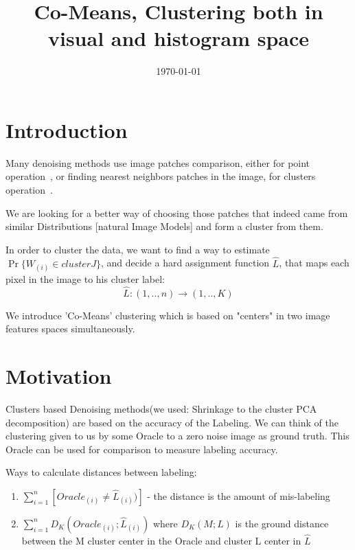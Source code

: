 \documentclass{article}
\title{Co-Means, Clustering both in visual and histogram space}
\author{}
\date{\today}
\begin{document}
\maketitle

\section{Introduction}
Many denoising methods use image patches comparison, either for point operation~\cite{BM3Dipol}, or finding nearest neighbors patches in the image, for clusters operation~\cite{nonlocalmeans}.

We are looking for a better way of choosing those patches that indeed came from similar Distributions [natural Image Models] and form a cluster from them.

In order to cluster the data, we want to find a way to estimate $ \Pr\{W_{(i)}\in cluster J \}$, and decide a hard assignment function $ \widehat{L} $, that maps each pixel in the image to his cluster label:
\begin{equation}
\hat L :(1,..,n)\rightarrow (1,..,K)
\end{equation}

We introduce 'Co-Means' clustering which is based on "centers" in two image features spaces simultaneously.


\section{Motivation}
Clusters based Denoising methods(we used: Shrinkage to the  cluster PCA decomposition) are based on the accuracy of the Labeling.
We can think of the clustering given to us by some Oracle to a zero noise image as ground truth. This Oracle can be used for comparison to measure labeling accuracy. 


Ways to calculate distances between labeling:
\begin{enumerate}
	\item $ \sum_{i=1}^{n} [Oracle_{(i)}\ne\hat{L}_{(i)})]$  - the distance is the amount of mis-labeling
	\item $ \sum_{i=1}^{n} D_K(Oracle_{(i)};\hat{L}_{(i)}) $ where $ D_K(M;L) $ is the ground distance between the M cluster center in the Oracle and cluster L center in $ \hat{L} $
\end{enumerate}
\end{document}
